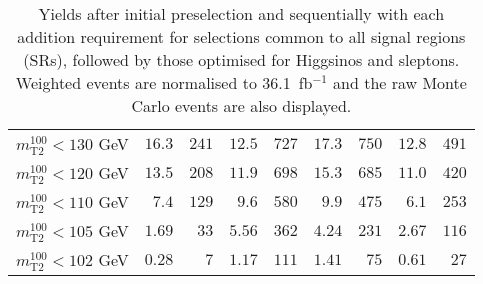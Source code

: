 \begin{table}
\begin{center}
\begin{tabular*}{\textwidth}{@{\extracolsep{\fill}}lrrrrrrrr}
    $m_\text{T2}^{100} < 130$ GeV & $16.3$ & $241$    & $12.5$ & $727$    & $17.3$ & $750$    & $12.8$ & $491$   \\ 
    $m_\text{T2}^{100} < 120$ GeV & $13.5$ & $208$    & $11.9$ & $698$    & $15.3$ & $685$    & $11.0$ & $420$   \\ 
    $m_\text{T2}^{100} < 110$ GeV & $7.4$ & $129$    & $9.6$ & $580$    & $9.9$ & $475$    & $6.1$ & $253$   \\ 
    $m_\text{T2}^{100} < 105$ GeV & $1.69$ & $33$    & $5.56$ & $362$    & $4.24$ & $231$    & $2.67$ & $116$   \\ 
    $m_\text{T2}^{100} < 102$ GeV & $0.28$ & $7$    & $1.17$ & $111$    & $1.41$ & $75$    & $0.61$ & $27$   \\ 
    
  \bottomrule
  \end{tabular*}
\end{center}
\caption{ Yields after initial preselection and sequentially with each addition requirement 
for selections common to all signal regions (SRs), 
followed by those optimised for Higgsinos and sleptons. 
Weighted events are normalised to 36.1~fb$^{-1}$ and the raw Monte Carlo events are also displayed.
}
\label{tab:cutflow_Higgsino}
\end{table} 
  